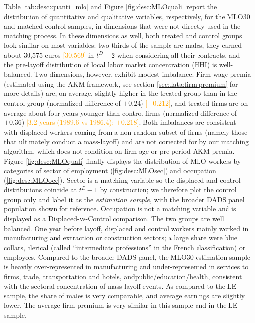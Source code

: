 Table \ref{tab:desc:quanti_mlo} and Figure \ref{fig:desc:MLOquali} report the distribution of quantitative and qualitative variables, respectively, for the MLO30 and matched control samples, in dimensions that were not directly used in the matching process. In these dimensions as well, both treated and control groups look similar on most variables: two thirds of the sample are males, they earned about 30,575 euros \textcolor{orange}{[30,569]} in $t^D-2$ when considering all their contracts, and the pre-layoff distribution of local labor market concentration (HHI) is well-balanced. Two dimensions, however, exhibit modest imbalance. Firm wage premia (estimated using the AKM framework, see section \ref{sec:data:firm:premium} for more details) are, on average, slightly higher in the treated group than in the control group (normalized difference of $+0.24$) \textcolor{orange}{[$+0.212$]}, and treated firms are on average about four years younger than control firms (normalized difference of $+0.36$) \textcolor{orange}{[3.2 years (1989.6 vs 1986.4); $+0.218$]}. Both imbalances are consistent with displaced workers coming from a non-random subset of firms (namely those that ultimately conduct a mass-layoff) and are not corrected for by our matching algorithm, which does not condition on firm age or pre-period AKM premia. Figure \ref{fig:desc:MLOquali} finally displays the distribution of MLO workers by categories of sector of employment (\ref{fig:desc:MLOsec}) and occupation (\ref{fig:desc:MLOocc}). Sector is a matching variable so the displaced and control distributions coincide at $t^D-1$ by construction; we therefore plot the control group only and label it as the \emph{estimation sample}, with the broader DADS panel population shown for reference. Occupation is not a matching variable and is displayed as a Displaced-vs-Control comparison. The two groups are well balanced. One year before layoff, displaced and control workers mainly worked in manufacturing and extraction or construction sectors; a large share were blue collars, clerical (called ``intermediate professions'' in the French classification) or employees. Compared to the broader DADS panel, the MLO30 estimation sample is heavily over-represented in manufacturing and under-represented in services to firms, trade, transportation and hotels, andpublic/education/health, consistent with the sectoral concentration of mass-layoff events. As compared to the LE sample, the share of males is very comparable, and average earnings are slightly lower. The average firm premium is very similar in this sample and in the LE sample.


